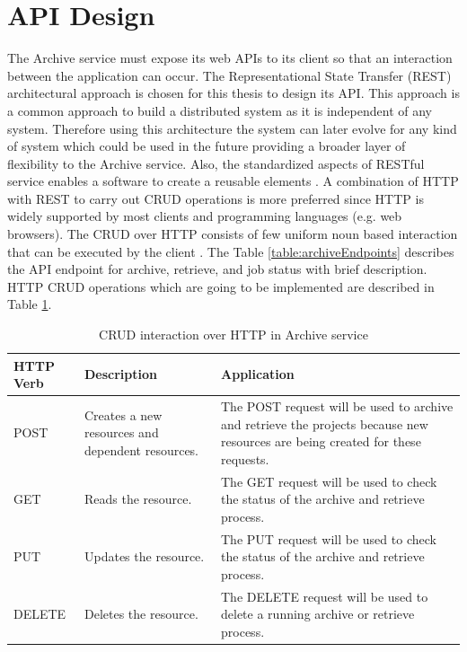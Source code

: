 \section{API Design}
\label{section:APIDesign}
    The Archive service must expose its web APIs to its client so that an interaction between the application can occur.
    The Representational State Transfer (REST) \cite[Chapter.~5]{REST} architectural approach is chosen for this thesis
    to design its API. This approach is a 
    common approach to build a distributed system as it is independent of any system. Therefore using this architecture the system can later 
    evolve for any kind of system which could be used in the future providing a broader layer of flexibility to the Archive service. 
    Also, the standardized aspects of RESTful service enables a software to create a reusable elements \cite{RESTThesis}. A combination of HTTP with REST to carry out
    CRUD operations is more preferred since HTTP is widely supported by most clients and programming languages (e.g. web browsers).
    The CRUD over HTTP consists of few uniform noun based interaction that can be executed by the client \cite[p.~13]{RESTThesis}. The
    Table \ref{table:archiveEndpoints} describes the API endpoint for archive, retrieve, and job status with brief description.
    HTTP CRUD operations which are going to be implemented are described in Table \ref{table:curdHttp}. 

    \begin{table}[H]
        \centering
        \begin{tabular}{|p{2cm}|p{4cm}|p{7.5cm}|}
            \hline
                \textbf{HTTP Verb}  & \textbf{Description} & \textbf{Application}\\
            \hline
                POST & 
                Creates a new resources and dependent resources.
                & The POST request will be used to archive and retrieve the projects because new resources are being created for these requests.\\
            \hline
                GET & Reads the resource. & The GET request will be used to check the status of the archive and retrieve process. \\
            \hline
            PUT & Updates the resource. & The PUT request will be used to check the status of the archive and retrieve process. \\
            \hline
                DELETE & Deletes the resource. & The DELETE request will be used to delete a running archive or retrieve process. \\                
            \hline
        \end{tabular}
        \caption{CRUD interaction over HTTP in Archive service}
        \label{table:curdHttp}     
    \end{table}   
    

